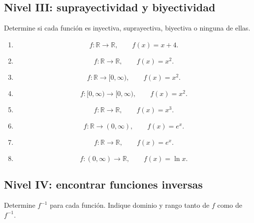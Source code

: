 \documentclass[12pt]{article}
\theoremstyle{remark}
\begin{document}
\subsection{Nivel III: suprayectividad y biyectividad}

Determine si cada función es inyectiva, suprayectiva, biyectiva o
ninguna de ellas.

\begin{enumerate}
    \item
    \[
    f:\mathbb{R}\to\mathbb{R},
    \qquad f(x)=x+4.
    \]

    \item
    \[
    f:\mathbb{R}\to\mathbb{R},
    \qquad f(x)=x^2.
    \]

    \item
    \[
    f:\mathbb{R}\to[0,\infty),
    \qquad f(x)=x^2.
    \]

    \item
    \[
    f:[0,\infty)\to[0,\infty),
    \qquad f(x)=x^2.
    \]

    \item
    \[
    f:\mathbb{R}\to\mathbb{R},
    \qquad f(x)=x^3.
    \]

    \item
    \[
    f:\mathbb{R}\to(0,\infty),
    \qquad f(x)=e^x.
    \]

    \item
    \[
    f:\mathbb{R}\to\mathbb{R},
    \qquad f(x)=e^x.
    \]

    \item
    \[
    f:(0,\infty)\to\mathbb{R},
    \qquad f(x)=\ln x.
    \]
\end{enumerate}

\subsection{Nivel IV: encontrar funciones inversas}

Determine \(f^{-1}\) para cada función. Indique dominio y rango tanto
de \(f\) como de \(f^{-1}\).
\end{document}
